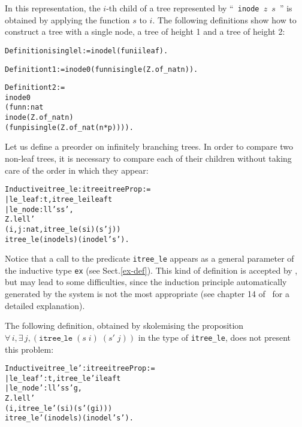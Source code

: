 \documentclass[11pt]{article}
\begin{document}
In this representation, the $i$-th child of a tree 
represented by ``~\texttt{inode $z$ $s$}~'' is obtained by applying
the function $s$ to $i$.
The following definitions show how to construct a tree with a single 
node, a tree of height 1 and a tree of height 2:

\begin{alltt}
Definition isingle l := inode l (fun i {\funarrow} ileaf).

Definition t1 := inode 0 (fun n {\funarrow} isingle (Z.of_nat n)).

Definition t2 := 
 inode 0 
      (fun n : nat {\funarrow} 
                   inode (Z.of_nat n)
                   (fun p {\funarrow} isingle (Z.of_nat (n*p)))).
\end{alltt}


Let us define a preorder on infinitely branching trees.
 In order to compare two non-leaf trees,
it is necessary to compare each of their children 
 without taking care of the order in which they
appear:

\begin{alltt}
Inductive itree_le : itree{\arrow} itree {\arrow} Prop :=
  | le_leaf : {\prodsym} t, itree_le  ileaf t
  | le_node : {\prodsym} l l' s s', 
                Z.le l l' {\arrow}
                ({\prodsym} i, {\exsym} j:nat, itree_le (s i) (s' j)){\arrow} 
                itree_le  (inode  l s) (inode  l' s').

\end{alltt}

Notice that a call to the predicate \texttt{itree\_le} appears as
a general parameter of the inductive type  \texttt{ex} (see Sect.\ref{ex-def}).
This kind of definition is accepted by {\coq}, but may lead to some
difficulties, since the induction principle automatically 
generated by the system
is not the most appropriate (see chapter 14 of~\cite{coqart} for a detailed
explanation).


The following definition, obtained by 
skolemising the
proposition \linebreak $\forall\, i,\exists\, j,(\texttt{itree\_le}\;(s\;i)\;(s'\;j))$ in
the type of \texttt{itree\_le}, does not present this problem:


\begin{alltt} 
Inductive itree_le' : itree{\arrow} itree {\arrow} Prop :=
  | le_leaf'  : {\prodsym} t, itree_le'  ileaf t
  | le_node' : {\prodsym} l l' s s' g, 
                  Z.le l l' {\arrow}
                  ({\prodsym} i, itree_le' (s i) (s' (g i))) {\arrow} 
                  itree_le'  (inode  l s) (inode  l' s').

\end{alltt}
\iffalse
\begin{alltt}
Lemma t1_le'_t2 :  itree_le' t1 t2.
Proof.
 unfold t1, t2.
 constructor 2  with (fun i : nat {\funarrow} 2 * i).
 auto with zarith.
 unfold isingle;
 intro i ; constructor 2 with (fun i :nat {\funarrow} i).
 auto with zarith.
 constructor .
Qed.
\end{alltt}
\fi
\end{document}
